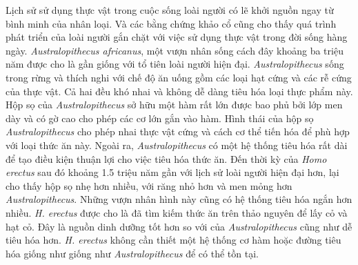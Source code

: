 \documentclass[
  letterpaper,
  DIV=11,
  numbers=noendperiod]{scrartcl}
\begin{document}
Lịch sử sử dụng thực vật trong cuộc sống loài người có lẽ khởi nguồn
ngay từ bình minh của nhân loại. Và các bằng chứng khảo cổ cũng cho thấy
quá trình phát triển của loài người gắn chặt với việc sử dụng thực vật
trong đời sống hàng ngày. \emph{Australopithecus africanus}, một vượn
nhân sống cách đây khoảng ba triệu năm được cho là gần giống với tổ tiên
loài người hiện đại. \emph{Australopithecus} sống trong rừng và thích
nghi với chế độ ăn uống gồm các loại hạt cứng và các rễ cứng của thực
vật. Cả hai đều khó nhai và không dễ dàng tiêu hóa loại thực phẩm này.
Hộp sọ của \emph{Australopithecus} sở hữu một hàm rất lớn được bao phủ
bởi lớp men dày và có gờ cao cho phép các cơ lớn gắn vào hàm. Hình thái
của hộp sọ \emph{Australopithecus} cho phép nhai thực vật cứng và cách
cơ thể tiến hóa để phù hợp với loại thức ăn này. Ngoài ra,
\emph{Australopithecus} có một hệ thống tiêu hóa rất dài để tạo điều
kiện thuận lợi cho việc tiêu hóa thức ăn. Đến thời kỳ của \emph{Homo
erectus} sau đó khoảng 1.5 triệu năm gần với lịch sử loài người hiện đại
hơn, lại cho thấy hộp sọ nhẹ hơn nhiều, với răng nhỏ hơn và men mỏng hơn
\emph{Australopithecus}. Những vượn nhân hình này cũng có hệ thống tiêu
hóa ngắn hơn nhiều. \emph{H. erectus} được cho là đã tìm kiếm thức ăn
trên thảo nguyên để lấy cỏ và hạt cỏ. Đây là nguồn dinh dưỡng tốt hơn so
với của \emph{Australopithecus} cũng như dễ tiêu hóa hơn. \emph{H.
erectus} không cần thiết một hệ thống cơ hàm hoặc đường tiêu hóa giống
như giống như \emph{Australopithecus} để có thể tồn tại.
\end{document}
